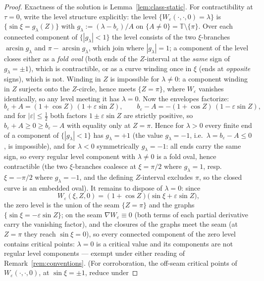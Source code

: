\documentclass[11pt]{amsart}
\theoremstyle{definition}
\theoremstyle{remark}
\newcommand{\T}{\mathbb{T}}
\begin{document}
\begin{proof}
Exactness of the solution is Lemma~\ref{lem:class-static}. For
contractibility at $\tau=0$, write the level structure explicitly: the
level $\{W_\varepsilon(\cdot,\cdot,0)=\lambda\}$ is
$\{\sin\xi=g_\lambda(Z)\}$ with
$g_\lambda:=(\lambda-b_\varepsilon)/A$ on
$\{A\neq0\}=\T\setminus\{\pi\}$. Over each connected component of
$\{|g_\lambda|<1\}$ the level consists of the two $\xi$-branches
$\arcsin g_\lambda$ and $\pi-\arcsin g_\lambda$, which join where
$|g_\lambda|=1$; a component of the level closes either as a
\emph{fold oval} (both ends of the $Z$-interval at the \emph{same}
sign of $g_\lambda=\pm1$), which is contractible, or as a curve
winding once in $\xi$ (ends at \emph{opposite} signs), which is not.
Winding in $Z$ is impossible for $\lambda\neq0$: a component winding
in $Z$ surjects onto the $Z$-circle, hence meets $\{Z=\pi\}$, where
$W_\varepsilon$ vanishes identically, so any level meeting it has
$\lambda=0$. Now the envelopes factorize:
\[
  b_\varepsilon+A=(1+\cos Z)\,(1+\varepsilon\sin Z),\qquad
  b_\varepsilon-A=-(1+\cos Z)\,(1-\varepsilon\sin Z),
\]
and for $|\varepsilon|\le\tfrac12$ both factors
$1\pm\varepsilon\sin Z$ are strictly positive, so
$b_\varepsilon+A\ge0\ge b_\varepsilon-A$ with equality only at
$Z=\pi$. Hence for $\lambda>0$ every finite end of a component of
$\{|g_\lambda|<1\}$ has $g_\lambda=+1$ (the value $g_\lambda=-1$,
i.e.\ $\lambda=b_\varepsilon-A\le0$, is impossible), and for
$\lambda<0$ symmetrically $g_\lambda=-1$: all ends carry the same
sign, so every regular level component with $\lambda\neq0$ is a fold
oval, hence contractible (the two $\xi$-branches coalesce at
$\xi=\pi/2$ where $g_\lambda=1$, resp.\ $\xi=-\pi/2$ where
$g_\lambda=-1$, and the defining $Z$-interval excludes $\pi$, so the
closed curve is an embedded oval). It remains to dispose of
$\lambda=0$: since
\[
  W_\varepsilon(\xi,Z,0)
  =(1+\cos Z)\bigl(\sin\xi+\varepsilon\sin Z\bigr),
\]
the zero level is the union of the seam $\{Z=\pi\}$ and the graphs
$\{\sin\xi=-\varepsilon\sin Z\}$; on the seam
$\nabla W_\varepsilon\equiv0$ (both terms of each partial derivative
carry the vanishing factor), and the closures of the graphs meet the
seam (at $Z=\pi$ they reach $\sin\xi=0$), so every connected component
of the zero level contains critical points: $\lambda=0$ is a critical
value and its components are not regular level components --- exempt
under either reading of Remark~\ref{rem:conventions}. (For
corroboration, the off-seam critical points of
$W_\varepsilon(\cdot,\cdot,0)$, at $\sin\xi=\pm1$, reduce under

\end{proof}
\end{document}
